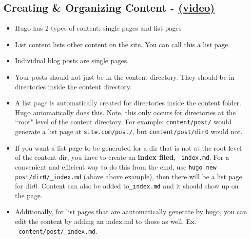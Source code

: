 \subsection{Creating \& Organizing Content - \href{https://youtu.be/0GZxidrlaRM?list=PLLAZ4kZ9dFpOnyRlyS-liKL5ReHDcj4G3}{(video)} }
\begin{itemize}
	\item
	Hugo has 2 types of content: single pages and list pages
	\item
	List content lists other content on the site. You can call this a list page.
	\item
	Individual blog posts are single pages.
	\item
	Your posts should not just be in the content directory. They should be in directories inside the content directory.
	\item
	A list page is automatically created for directories inside the content folder.  Hugo automatically does this. Note, this only occurs for directories at the ``root" level of the content directory. For example:  \texttt{content/post/} would generate a list page at \texttt{site.com/post/}, but \texttt{content/post/dir0} would not.
	\item
	If you want a list page to be generated for a dir that is not at the root level of the content dir, you have to create an \textbf{index filed}, \texttt{\_index.md}. For a convenient and efficient way to do this from the cmd, use \texttt{hugo new post/dir0/\_index.md} (above above example), then there will be a list page for dir0. 	Content can also be added to\texttt{\_index.md} and it should show up on the page.
	\item
	Additionally, for list pages that are aautomatically generate by hugo, you can edit the content by adding an index.md to those as well. Ex. \texttt{~content/post/\_index.md}.
\end{itemize}

